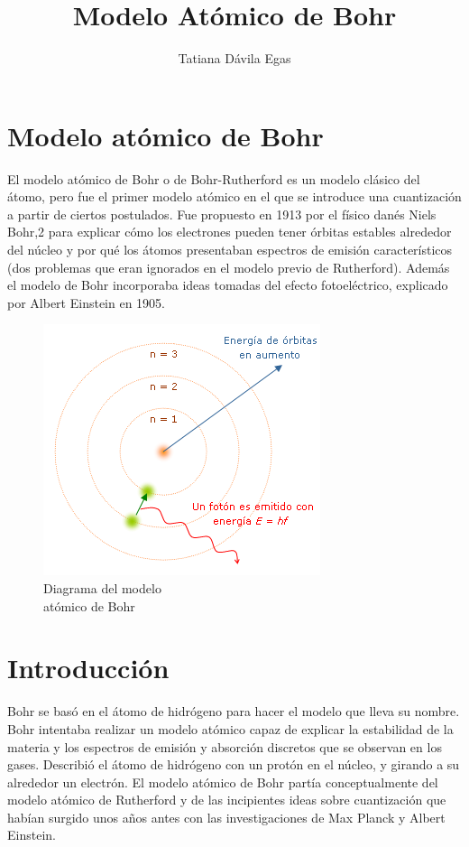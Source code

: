 \documentclass[12pt,a4paper]{article}
\author{Tatiana Dávila Egas}
\title{Modelo Atómico de Bohr}
\date{}
\begin{document}
\maketitle
\tableofcontents

\section{Modelo atómico de Bohr} 
El modelo atómico de Bohr o de Bohr-Rutherford es un modelo clásico del átomo, pero fue el primer modelo atómico en el que se introduce una cuantización a partir de ciertos postulados. Fue propuesto en 1913 por el físico danés Niels Bohr,2 para explicar cómo los electrones pueden tener órbitas estables alrededor del núcleo y por qué los átomos presentaban espectros de emisión característicos (dos problemas que eran ignorados en el modelo previo de Rutherford). Además el modelo de Bohr incorporaba ideas tomadas del efecto fotoeléctrico, explicado por Albert Einstein en 1905.
\begin{figure}[!ht]
\includegraphics[scale=0.6]{Modelo_de_Bohr.png}
\centering 
\caption{Diagrama del modelo\\ atómico de Bohr}
\end{figure}

\section{Introducción} 

Bohr se basó en el átomo de hidrógeno para hacer el modelo que lleva su nombre. Bohr intentaba realizar un modelo atómico capaz de explicar la estabilidad de la materia y los espectros de emisión y absorción discretos que se observan en los gases. Describió el átomo de hidrógeno con un protón en el núcleo, y girando a su alrededor un electrón. El modelo atómico de Bohr partía conceptualmente del modelo atómico de Rutherford y de las incipientes ideas sobre cuantización que habían surgido unos años antes con las investigaciones de Max Planck y Albert Einstein.
\end{document}
